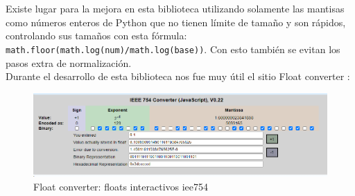 \documentclass[a4paper,10pt,twocolumn]{article}
\begin{document}
	Existe lugar para la mejora en esta biblioteca utilizando solamente las mantisas como números enteros de Python que no tienen límite de tamaño y son rápidos, controlando sus tamaños con esta fórmula:
	\texttt{ math.floor(math.log(num)/math.log(base))}. Con esto también se evitan los pasos extra de normalización.\\
	
	Durante el desarrollo de esta biblioteca nos fue muy útil el sitio Float converter \cite{Converter}:
	
	\begin{figure}[H]
		\centering
		\includegraphics[width=1.1\linewidth]{res/screenshot003}
		\caption{Float converter: floats interactivos iee754}
	\end{figure}
	
	
	
	
	
	\label{end}
	
\end{document}
